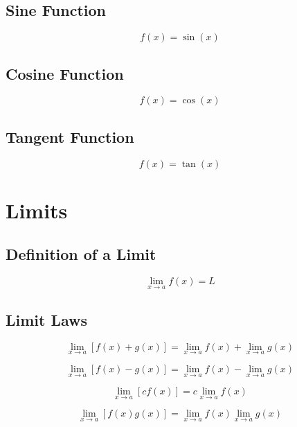 \documentclass{book}
\begin{document}
\subsection{Sine Function}
\begin{equation}
    f(x) = \sin(x)
\end{equation}

\subsection{Cosine Function}
\begin{equation}
    f(x) = \cos(x)
\end{equation}

\subsection{Tangent Function}
\begin{equation}
    f(x) = \tan(x)
\end{equation}

\section{Limits}
\subsection{Definition of a Limit}
\begin{equation}
    \lim_{x \to a} f(x) = L
\end{equation}

\subsection{Limit Laws}
\begin{equation}
    \lim_{x \to a} [f(x) + g(x)] = \lim_{x \to a} f(x) + \lim_{x \to a} g(x)
\end{equation}

\begin{equation}
    \lim_{x \to a} [f(x) - g(x)] = \lim_{x \to a} f(x) - \lim_{x \to a} g(x)
\end{equation}

\begin{equation}
    \lim_{x \to a} [cf(x)] = c \lim_{x \to a} f(x)
\end{equation}

\begin{equation}
    \lim_{x \to a} [f(x)g(x)] = \lim_{x \to a} f(x) \lim_{x \to a} g(x)
\end{equation}
\end{document}
